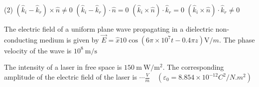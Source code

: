 \begin{enumerate}
\begin{minipage}{\textwidth}
\end{minipage}
\begin{tasks}(2)
	\task[\textbf{A.}] $\left(\hat{k}_{i}-\hat{k}_{r}\right) \times \hat{n} \neq 0$
	\task[\textbf{B.}]$\left(\hat{k}_{i}-\hat{k}_{r}\right) \cdot \hat{n}=0$
	\task[\textbf{C.}]$\left(\hat{k}_{i} \times \hat{n}\right) \cdot \hat{k}_{r}=0$
	\task[\textbf{D.}]$\left(\hat{k}_{i} \times \hat{n}\right) \cdot \hat{k}_{r} \neq 0$
\end{tasks}
\begin{minipage}{\textwidth}
	\item The electric field of a uniform plane wave propagating in a dielectric non-conducting medium is given by $\vec{E}=\hat{x} 10 \cos \left(6 \pi \times 10^{7} t-0.4 \pi z\right) \mathrm{V} / m$. The phase velocity of the wave is $10^{8} \mathrm{~m} / \mathrm{s}$ 
\end{minipage}
\begin{minipage}{\textwidth}
	\item The intensity of a laser in free space is $150 \mathrm{~m} \mathrm{~W} / \mathrm{m}^{2}$. The corresponding amplitude of the electric field of the laser is $\cdots\frac{V}{m} \quad\left(\varepsilon_{0}=8.854 \times 10^{-12} C^{2} / N . m^{2}\right)$
\end{minipage}


\end{enumerate}
